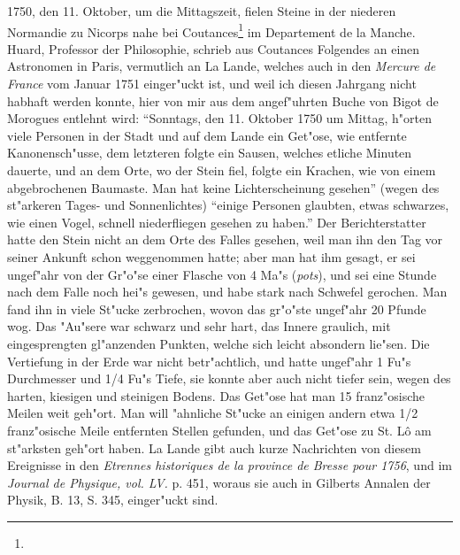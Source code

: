 \documentclass[a4paper, 11pt, oneside, polutonikogreek, german]{article}
\begin{document}
1750, den 11. Oktober, um die Mittagszeit, fielen Steine in der niederen Normandie zu Nicorps nahe bei Coutances\footnote{} im Departement de la Manche. Huard, Professor der Philosophie, schrieb aus Coutances Folgendes an einen Astronomen in Paris, vermutlich an La Lande, welches auch in den \emph{Mercure de France} vom Januar 1751 einger"uckt ist, und weil ich diesen Jahrgang nicht habhaft werden konnte, hier von mir aus dem angef"uhrten Buche von Bigot de Morogues entlehnt wird: "`Sonntags, den 11. Oktober 1750 um Mittag, h"orten viele Personen in der Stadt und auf dem Lande ein Get"ose, wie entfernte Kanonensch"usse, dem letzteren folgte ein Sausen, welches etliche Minuten dauerte, und an dem Orte, wo der Stein fiel, folgte ein Krachen, wie von einem abgebrochenen Baumaste. Man hat keine Lichterscheinung gesehen"' (wegen des st"arkeren Tages- und Sonnenlichtes) "`einige Personen glaubten, etwas schwarzes, wie einen Vogel, schnell niederfliegen gesehen zu haben."' Der Berichterstatter hatte den Stein nicht an dem Orte des Falles gesehen, weil man ihn den Tag vor seiner Ankunft schon weggenommen hatte; aber man hat ihm gesagt, er sei ungef"ahr von der Gr"o"se einer Flasche von 4 Ma"s (\emph{pots}), und sei eine Stunde nach dem Falle noch hei"s gewesen, und habe stark nach Schwefel gerochen. Man fand ihn in viele St"ucke zerbrochen, wovon das gr"o"ste ungef"ahr 20 Pfunde wog. Das "Au"sere war schwarz und sehr hart, das Innere graulich, mit eingesprengten gl"anzenden Punkten, welche sich leicht absondern lie"sen. Die Vertiefung in der Erde war nicht betr"achtlich, und hatte ungef"ahr 1 Fu"s Durchmesser und 1/4 Fu"s Tiefe, sie konnte aber auch nicht tiefer sein, wegen des harten, kiesigen und steinigen Bodens. Das Get"ose hat man 15 franz"osische Meilen weit geh"ort. Man will "ahnliche St"ucke an einigen andern etwa 1/2 franz"osische Meile entfernten Stellen gefunden, und das Get"ose zu St. Lô am st"arksten geh"ort haben. La Lande gibt auch kurze Nachrichten von diesem Ereignisse in den \emph{Etrennes historiques de la province de Bresse pour 1756}, und im \emph{Journal de Physique, vol. LV.} p. 451, woraus sie auch in Gilberts Annalen der Physik, B. 13, S. 345, einger"uckt sind.
\end{document}
